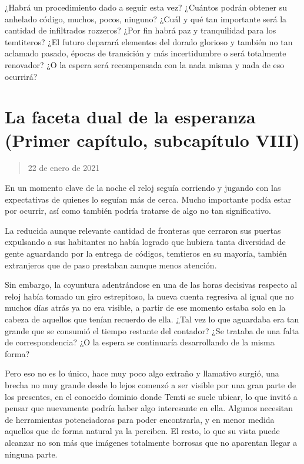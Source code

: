 \documentclass[
  spanish,
]{book}
\begin{document}
¿Habrá un procedimiento dado a seguir esta vez? ¿Cuántos podrán obtener su anhelado código, muchos, pocos, ninguno? ¿Cuál y qué tan importante será la cantidad de infiltrados rozzeros? ¿Por fin habrá paz y tranquilidad para los temtiteros? ¿El futuro deparará elementos del dorado glorioso y también no tan aclamado pasado, épocas de transición y más incertidumbre o será totalmente renovador? ¿O la espera será recompensada con la nada misma y nada de eso ocurrirá?

\hypertarget{la-faceta-dual-de-la-esperanza-primer-capuxedtulo-subcapuxedtulo-viii}{%
\section{La faceta dual de la esperanza (Primer capítulo, subcapítulo VIII)}\label{la-faceta-dual-de-la-esperanza-primer-capuxedtulo-subcapuxedtulo-viii}}

\begin{quote}
22 de enero de 2021
\end{quote}

En un momento clave de la noche el reloj seguía corriendo y jugando con las expectativas de quienes lo seguían más de cerca. Mucho importante podía estar por ocurrir, así como también podría tratarse de algo no tan significativo.

La reducida aunque relevante cantidad de fronteras que cerraron sus puertas expulsando a sus habitantes no había logrado que hubiera tanta diversidad de gente aguardando por la entrega de códigos, temtieros en su mayoría, también extranjeros que de paso prestaban aunque menos atención.

Sin embargo, la coyuntura adentrándose en una de las horas decisivas respecto al reloj había tomado un giro estrepitoso, la nueva cuenta regresiva al igual que no muchos días atrás ya no era visible, a partir de ese momento estaba solo en la cabeza de aquellos que tenían recuerdo de ella. ¿Tal vez lo que aguardaba era tan grande que se consumió el tiempo restante del contador? ¿Se trataba de una falta de correspondencia? ¿O la espera se continuaría desarrollando de la misma forma?

Pero eso no es lo único, hace muy poco algo extraño y llamativo surgió, una brecha no muy grande desde lo lejos comenzó a ser visible por una gran parte de los presentes, en el conocido dominio donde Temti se suele ubicar, lo que invitó a pensar que nuevamente podría haber algo interesante en ella. Algunos necesitan de herramientas potenciadoras para poder encontrarla, y en menor medida aquellos que de forma natural ya la perciben. El resto, lo que su vista puede alcanzar no son más que imágenes totalmente borrosas que no aparentan llegar a ninguna parte.
\end{document}
